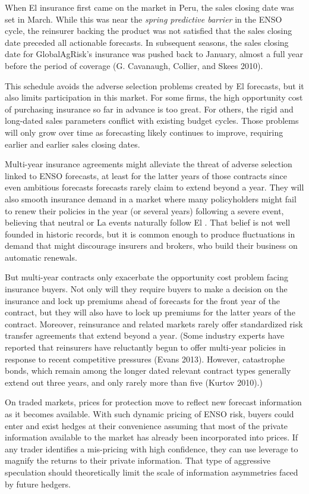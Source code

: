 \documentclass[article]{jss}
\begin{document}
When El  insurance first came on the market in Peru, the
sales closing date was set in March. While this was near the
\emph{spring predictive barrier} in the ENSO cycle, the reinsurer
backing the product was not satisfied that the sales closing date
preceded all actionable forecasts. In subsequent seasons, the sales
closing date for GlobalAgRisk's insurance was pushed back to January,
almost a full year before the period of coverage (G. Cavanaugh, Collier,
and Skees 2010).

This schedule avoids the adverse selection problems created by El
 forecasts, but it also limits participation in this
market. For some firms, the high opportunity cost of purchasing
insurance so far in advance is too great. For others, the rigid and
long-dated sales parameters conflict with existing budget cycles. Those
problems will only grow over time as forecasting likely continues to
improve, requiring earlier and earlier sales closing dates.

Multi-year insurance agreements might alleviate the threat of adverse
selection linked to ENSO forecasts, at least for the latter years of
those contracts since even ambitious forecasts forecasts rarely claim to
extend beyond a year. They will also smooth insurance demand in a market
where many policyholders might fail to renew their policies in the year
(or several years) following a severe event, believing that neutral or
La  events naturally follow El . That belief
is not well founded in historic records, but it is common enough to
produce fluctuations in demand that might discourage insurers and
brokers, who build their business on automatic renewals.

But multi-year contracts only exacerbate the opportunity cost problem
facing insurance buyers. Not only will they require buyers to make a
decision on the insurance and lock up premiums ahead of forecasts for
the front year of the contract, but they will also have to lock up
premiums for the latter years of the contract. Moreover, reinsurance and
related markets rarely offer standardized risk transfer agreements that
extend beyond a year. (Some industry experts have reported that
reinsurers have reluctantly begun to offer multi-year policies in
response to recent competitive pressures (Evans 2013). However,
catastrophe bonds, which remain among the longer dated relevant contract
types generally extend out three years, and only rarely more than five
(Kurtov 2010).)

On traded markets, prices for protection move to reflect new forecast
information as it becomes available. With such dynamic pricing of ENSO
risk, buyers could enter and exist hedges at their convenience assuming
that most of the private information available to the market has already
been incorporated into prices. If any trader identifies a mis-pricing
with high confidence, they can use leverage to magnify the returns to
their private information. That type of aggressive speculation should
theoretically limit the scale of information asymmetries faced by future
hedgers.
\end{document}

